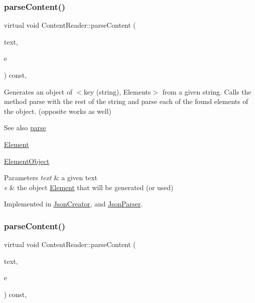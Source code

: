 \subsubsection{\texorpdfstring{parse\+Content()}{parseContent()}\hspace{0.1cm}{\footnotesize\ttfamily [5/6]}}
{\footnotesize\ttfamily virtual void Content\+Reader\+::parse\+Content (\begin{DoxyParamCaption}\item[{std\+::string \&}]{text,  }\item[{\mbox{\hyperlink{classElementObject}{Element\+Object}} $\ast$}]{e }\end{DoxyParamCaption}) const\hspace{0.3cm}{\ttfamily [pure virtual]}, {\ttfamily [inherited]}}

Generates an object of $<$key (string), Elements$>$ from a given string. Calls the method parse with the rest of the string and parse each of the found elements of the object. (opposite works as well) \begin{DoxySeeAlso}{See also}
\mbox{\hyperlink{classContentReader_a7fff2e63a2e8fa216665604f69974e1d}{parse}} 

\mbox{\hyperlink{classElement}{Element}} 

\mbox{\hyperlink{classElementObject}{Element\+Object}}
\end{DoxySeeAlso}

\begin{DoxyParams}{Parameters}
{\em text} & a given text \\
\hline
{\em e} & the object \mbox{\hyperlink{classElement}{Element}} that will be generated (or used) \\
\hline
\end{DoxyParams}


Implemented in \mbox{\hyperlink{classJsonCreator_a9f57af1a7925074b8e3e4175f74c886a}{Json\+Creator}}, and \mbox{\hyperlink{classJsonParser_a7d4fad0f0947a74ca158dc1922c97355}{Json\+Parser}}.

\mbox{\label{classContentReader_ab4ba739ee5241848ae8af86e64e43a40}} 
\subsubsection{\texorpdfstring{parse\+Content()}{parseContent()}\hspace{0.1cm}{\footnotesize\ttfamily [6/6]}}
{\footnotesize\ttfamily virtual void Content\+Reader\+::parse\+Content (\begin{DoxyParamCaption}\item[{std\+::string \&}]{text,  }\item[{\mbox{\hyperlink{classElementDouble}{Element\+Double}} $\ast$}]{e }\end{DoxyParamCaption}) const\hspace{0.3cm}{\ttfamily [pure virtual]}, {\ttfamily [inherited]}}

